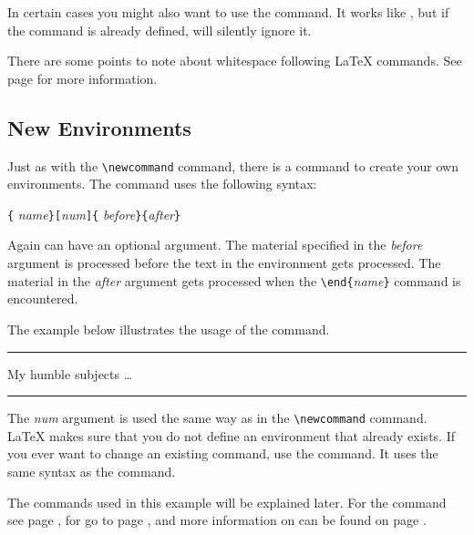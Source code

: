 In certain cases you might also want to use the 
command. It works like , but if the command is
already defined, \LaTeXe{} will silently ignore it.

There are some points to note about whitespace following \LaTeX{} commands. See
page \pageref{whitespace} for more information.

\subsection{New Environments}
Just as with the \verb|\newcommand| command, there is a command
to create your own environments. The  command uses the
following syntax:

\begin{lscommand}
\verb|{|%
       \emph{name}\verb|}[|\emph{num}\verb|]{|%
       \emph{before}\verb|}{|\emph{after}\verb|}|
\end{lscommand}

Again  can have
an optional argument. The material specified
in the \emph{before} argument is processed before the text in the
environment gets processed. The material in the \emph{after} argument gets
processed when the \verb|\end{|\emph{name}\verb|}| command is encountered.

The example below illustrates the usage of the 
command.
\begin{example}
\newenvironment{king}
 {\rule{1ex}{1ex}%
      \hspace{\stretch{1}}}
 {%
      \rule{1ex}{1ex}}

\begin{king}
My humble subjects \ldots
\end{king}
\end{example}

The \emph{num} argument is used the same way as in the
\verb|\newcommand| command. \LaTeX{} makes sure that you do not define
an environment that already exists. If you ever want to change an
existing command, use the  command. It
uses the same syntax as the  command.

The commands used in this example will be explained later. For the
 command see page \pageref{sec:rule}, for  go to
page \pageref{cmd:stretch}, and more information on  can be
found on page \pageref{sec:hspace}.

